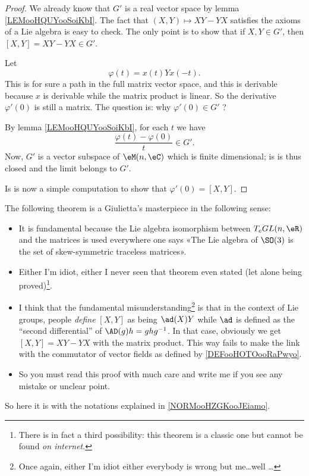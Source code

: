 \begin{proof}
	We already know that \( G'\) is a real vector space by lemma \ref{LEMooHQUYooSoiKbI}. The fact that \( (X,Y)\mapsto XY-YX\) satisfies the axioms of a Lie algebra is easy to check. The only point is to show that if \( X,Y\in G'\), then \( [X,Y]=XY-YX\in G'\).

	Let
	\begin{equation}        \label{EQooJDTLooGWsDiq}
		\varphi(t)=x(t)Yx(-t).
	\end{equation}
	This is for sure a path in the full matrix vector space, and this is derivable because \( x\) is derivable while the matrix product is linear. So the derivative \( \varphi'(0)\) is still a matrix. The question is: why \( \varphi'(0)\in G'\) ?

	By lemma \ref{LEMooHQUYooSoiKbI}, for each \( t\) we have
	\begin{equation}
		\frac{ \varphi(t)-\varphi(0) }{ t }\in G'.
	\end{equation}
	Now, \( G'\) is a vector subspace of \( \eM(n,\eC)\) which is finite dimensional; is is thus closed and the limit belongs to \( G'\).

	Is is now a simple computation to show that \( \varphi'(0)=[X,Y]\).
\end{proof}

\begin{normaltext}
	The following theorem is a Giulietta's masterpiece in the following sense:
	\begin{itemize}
		\item It is fundamental because the Lie algebra isomorphism between \( T_eGL(n,\eR)\) and the matrices is used everywhere one says «The Lie algebra of $\SO(3)$ is the set of skew-symmetric traceless matrices».
		\item
		      Either I'm idiot, either I never seen that theorem even stated (let alone being proved)\footnote{There is in fact a third possibility:  this theorem is a classic one but cannot be found \emph{on internet}.}.
		\item
		      I think that the fundamental misunderstanding\footnote{Once again, either I'm idiot either everybody is wrong but me\ldots well \ldots} is that in the context of Lie groups, people \emph{define} \( [X,Y]\) as being \( \ad(X)Y\) while \( \ad\) is defined as the ``second differential'' of \( \AD(g)h=ghg^{-1}\). In that case, obviously we get \( [X,Y]=XY-YX\) with the matrix product. This way fails to make the link with the commutator of vector fields as defined by \ref{DEFooHOTOooRaPwyo}.
		\item
		      So you must read this proof with much care and write me if you see any mistake or unclear point.
	\end{itemize}
\end{normaltext}
So here it is with the notations explained in \ref{NORMooHZGKooJEiamo}.

